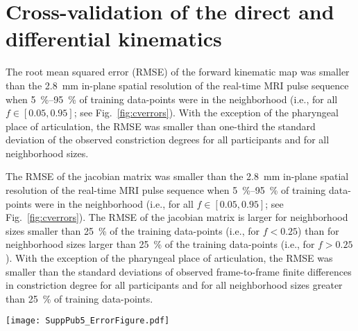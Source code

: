 \documentclass[reprint]{JASAnew}\usepackage[]{graphicx}\usepackage[]{color}
\begin{document}
\section{Cross-validation of the direct and differential kinematics}
\label{sec:crossvalidation}

The root mean squared error (RMSE) of the forward kinematic map was smaller than the \SI{2.8}{\milli\meter} in-plane spatial resolution of the real-time MRI pulse sequence when \SIrange{5}{95}{\percent} of training data-points were in the neighborhood (i.e., for all $f\in \left[ 0.05, 0.95\right]$; see Fig.~\ref{fig:cverrors}). With the exception of the pharyngeal place of articulation, the RMSE was smaller than one-third the standard deviation of the observed constriction degrees for all participants and for all neighborhood sizes.

The RMSE of the jacobian matrix was smaller than the \SI{2.8}{\milli\meter} in-plane spatial resolution of the real-time MRI pulse sequence when \SIrange{5}{95}{\percent} of training data-points were in the neighborhood (i.e., for all $f\in \left[ 0.05, 0.95\right]$; see Fig.~\ref{fig:cverrors}).
%
The RMSE of the jacobian matrix is larger for neighborhood sizes smaller than \SI{25}{\percent} of the training data-points (i.e., for $f<0.25$) than for neighborhood sizes larger than \SI{25}{\percent} of the training data-points (i.e., for $f>0.25$). 
%
With the exception of the pharyngeal place of articulation, the RMSE was smaller than the standard deviations of observed frame-to-frame finite differences in constriction degree for all participants and for all neighborhood sizes greater than \SI{25}{\percent} of training data-points. 

\begin{figure*}
\raggedright
\texttt{[image: SuppPub5\_ErrorFigure.pdf]}
\caption{
{\bf (a)} Root mean squared error (RMSE) of the forward kinematic map estimator of constriction degrees and {\bf (b)} RMSE of the jacobian matrix estimator of frame-to-frame finite differences in constriction degrees. 
Data-points are the median RMSE computed over all 10 folds of cross-validation.
Lines connect the RMSE values of a single participant at different neighborhood sizes ($X$-axis).
Neighborhood size is given as percentage of training data-points.
The standard deviations of observed (frame-to-frame finite differences in) constriction degrees are indicated as tick marks on the right $Y$-axis for each participant whenever the standard deviations are small enough to fit within the $Y$-axis limits.}
\label{fig:cverrors}
\end{figure*}
\end{document}
